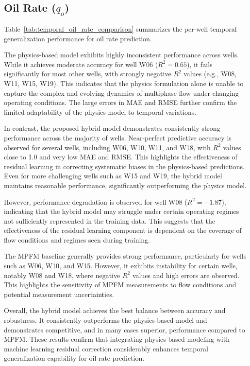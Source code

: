 \documentclass[12pt,APA]{uomthesis}
\begin{document}
\subsection{Oil Rate ($q_o$)}
Table~\ref{tab:temporal_oil_rate_comparison} summarizes the per-well temporal generalization performance for oil rate prediction.

The physics-based model exhibits highly inconsistent performance across wells. While it achieves moderate accuracy for well W06 ($R^2 = 0.65$), it fails significantly for most other wells, with strongly negative $R^2$ values (e.g., W08, W11, W15, W19). This indicates that the physics formulation alone is unable to capture the complex and evolving dynamics of multiphase flow under changing operating conditions. The large errors in MAE and RMSE further confirm the limited adaptability of the physics model to temporal variations.

In contrast, the proposed hybrid model demonstrates consistently strong performance across the majority of wells. Near-perfect predictive accuracy is observed for several wells, including W06, W10, W11, and W18, with $R^2$ values close to 1.0 and very low MAE and RMSE. This highlights the effectiveness of residual learning in correcting systematic biases in the physics-based predictions. Even for more challenging wells such as W15 and W19, the hybrid model maintains reasonable performance, significantly outperforming the physics model.

However, performance degradation is observed for well W08 ($R^2 = -1.87$), indicating that the hybrid model may struggle under certain operating regimes not sufficiently represented in the training data. This suggests that the effectiveness of the residual learning component is dependent on the coverage of flow conditions and regimes seen during training.

The MPFM baseline generally provides strong performance, particularly for wells such as W06, W10, and W15. However, it exhibits instability for certain wells, notably W08 and W18, where negative $R^2$ values and high errors are observed. This highlights the sensitivity of MPFM measurements to flow conditions and potential measurement uncertainties.

Overall, the hybrid model achieves the best balance between accuracy and robustness. It consistently outperforms the physics-based model and demonstrates competitive, and in many cases superior, performance compared to MPFM. These results confirm that integrating physics-based modeling with machine learning residual correction considerably enhances temporal generalization capability for oil rate prediction.
\end{document}
